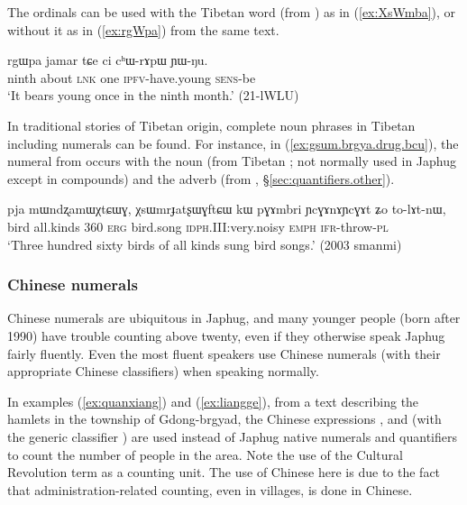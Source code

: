 The ordinals can be used with the Tibetan word  (from ) as in (\ref{ex:XsWmba}), or without it as in (\ref{ex:rgWpa}) from the same text.

\begin{exe}
\ex \label{ex:rgWpa}
\gll  rgɯpa jamar tɕe ci cʰɯ-rɤpɯ ɲɯ-ŋu. \\
ninth about \textsc{lnk} one \textsc{ipfv}-have.young  \textsc{sens}-be \\
\glt `It bears young once in the ninth month.' (21-lWLU)
\end{exe}

In traditional stories of Tibetan origin, complete noun phrases in Tibetan including numerals can be found. For instance, in (\ref{ex:gsum.brgya.drug.bcu}), the numeral  from  occurs with the noun   (from Tibetan ; not normally used in Japhug except in compounds) and the adverb  (from , §\ref{sec:quantifiers.other}).

\begin{exe}
\ex \label{ex:gsum.brgya.drug.bcu}
\gll pja mɯndʐamɯχtɕɯɣ, χsɯmrɟatʂɯɣftɕɯ kɯ pɣɤmbri ɲcɣɤnɤɲcɣɤt ʑo to-lɤt-nɯ, \\
 bird all.kinds 360 \textsc{erg} bird.song \textsc{idph}.III:very.noisy \textsc{emph} \textsc{ifr}-throw-\textsc{pl} \\
\glt `Three hundred sixty birds of all kinds sung bird songs.' (2003 smanmi)
\end{exe}

\subsubsection{Chinese numerals}  \label{sec:chinese.numerals}
Chinese numerals are ubiquitous in Japhug, and many younger people (born after 1990) have trouble counting above twenty, even if they otherwise speak Japhug fairly fluently. Even the most fluent speakers use Chinese numerals (with their appropriate Chinese classifiers) when speaking normally. 

In examples (\ref{ex:quanxiang}) and (\ref{ex:liangge}), from a text describing the hamlets in the township of Gdong-brgyad, the Chinese expressions ,  and  (with the generic classifier ) are used instead of Japhug native numerals and quantifiers to count the number of people in the area. Note the use of the Cultural Revolution term  as a counting unit. The use of Chinese here is due to the fact that administration-related counting, even in villages, is done in Chinese.


